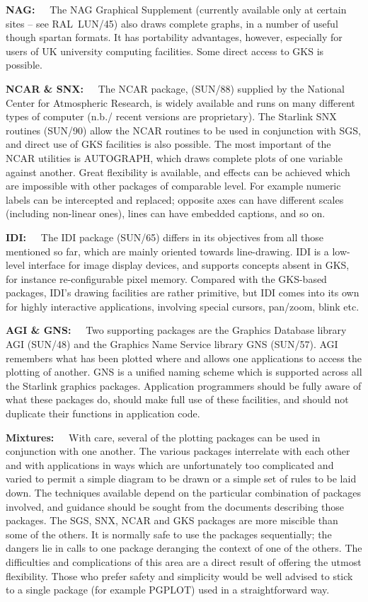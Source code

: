 \documentclass[twoside,11pt,nolof,noabs]{starlink}
\renewcommand{\_}{{\tt\char'137}}
\begin{document}
\textbf{NAG:~~} The NAG Graphical Supplement (currently available
only at certain sites --  see RAL~LUN/45) also draws complete graphs,
in a number of useful though spartan formats.  It has
portability advantages, however, especially for users of
UK university computing facilities.  Some direct access to GKS is possible.

\textbf{NCAR \& SNX:~~} The \mbox{NCAR} package, (SUN/88) supplied by the
National Center for Atmospheric Research, is widely available and runs
on many different types of computer (n.b./ recent versions are proprietary).
The Starlink SNX routines (SUN/90) allow the \mbox{NCAR} routines
to be used in conjunction with SGS, and direct use of GKS
facilities is also possible.  The most important
of the \mbox{NCAR} utilities is \mbox{AUTOGRAPH}, which draws complete
plots of one variable against another.  Great flexibility
is available, and effects can be achieved which are
impossible with other packages of comparable level.  For
example numeric labels can be intercepted and replaced;
opposite axes can have different scales (including
non-linear ones), lines can have embedded captions, and so on.

\textbf{IDI:~~} The IDI package (SUN/65) differs in its objectives from all
those mentioned so far, which are mainly oriented towards line-drawing.
IDI is a low-level interface for image display devices, and supports
concepts absent in GKS,
for instance re-configurable pixel memory.
Compared with the GKS-based packages,
IDI's drawing facilities are rather primitive, but IDI comes
into its own for highly interactive applications, involving
special cursors, pan/zoom, blink etc.

\textbf{AGI \& GNS:~~} Two supporting packages are the Graphics Database library
AGI (SUN/48) and the Graphics Name Service library GNS (SUN/57).
AGI remembers what has been plotted where and allows one
applications to access the plotting of another.  GNS is a
unified naming scheme which is supported across all the
Starlink graphics packages.
Application programmers should be fully aware of what
these packages do, should make full use of these facilities,
and should not duplicate their functions in application code.

\textbf{Mixtures:~~} With care, several of the plotting packages can
be used in conjunction with one another.  The various packages
interrelate with each other and with applications
in ways which are unfortunately too complicated and
varied to permit a simple diagram to be drawn or a simple
set of rules to be laid down.  The techniques available depend on the
particular combination of packages
involved, and guidance should be sought from
the documents describing those packages.   The SGS, SNX,
NCAR and GKS packages are more miscible than some of the
others.  It is normally safe to use the packages
sequentially;  the dangers lie in calls to one package
deranging the context of one of the others.  The difficulties
and complications of this area are a direct result of
offering the utmost flexibility.  Those who prefer
safety and simplicity would be well advised to stick to a single
package (for example \mbox{PGPLOT}) used in a straightforward way.
\end{document}
